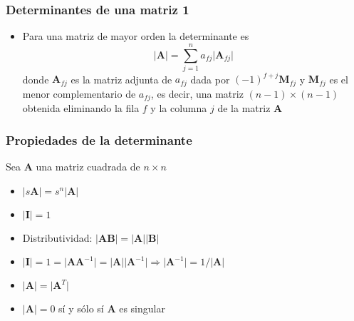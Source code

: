 \documentclass{beamer}
\begin{document}
\begin{frame}
\frametitle{Determinantes de una matriz 1}

\begin{itemize}

\item Para una matriz de mayor orden la determinante es 
\begin{equation*}
\vert \boldsymbol{A} \vert= \displaystyle \sum_{j=1}^{n}{a_{fj} \vert \boldsymbol{A}_{fj}\vert  }
\end{equation*}
donde $\boldsymbol{A}_{fj}$ es la matriz adjunta de $a_{fj}$ dada por $(-1)^{f+j}\boldsymbol{M}_{fj}$ y $\boldsymbol{M}_{fj}$ es el menor complementario de $a_{fj}$, es decir, una matriz $(n-1)\times(n-1)$ obtenida eliminando la fila $f$ y la columna $j$ de la matriz $\boldsymbol{A}$ 
\end{itemize}

\end{frame}
\begin{frame}
\frametitle{Propiedades de la determinante}
Sea $\boldsymbol{A}$ una matriz cuadrada de $n  \times n$ 
\begin{itemize}
\item $\vert s \boldsymbol{A} \vert= s^n \vert \boldsymbol{A} \vert$
\item $\vert \boldsymbol{I} \vert =1$ 
\item Distributividad: $\vert  \boldsymbol{AB} \vert = \vert  \boldsymbol{A} \vert \vert  \boldsymbol{B} \vert$ 
\item $\vert \boldsymbol{I} \vert = 1 = \vert \boldsymbol{A} \boldsymbol{A}^{-1}\vert =\vert \boldsymbol{A} \vert\vert \boldsymbol{A}^{-1}\vert \Rightarrow \vert \boldsymbol{A}^{-1}\vert= 1/ \vert \boldsymbol{A}\vert$
\item $\vert \boldsymbol{A} \vert = \vert \boldsymbol{A}^{T}\vert$
\item $\vert \boldsymbol{A} \vert =0 $ sí y sólo sí $\boldsymbol{A}$ es singular
\end{itemize}


\end{frame}
\end{document}
